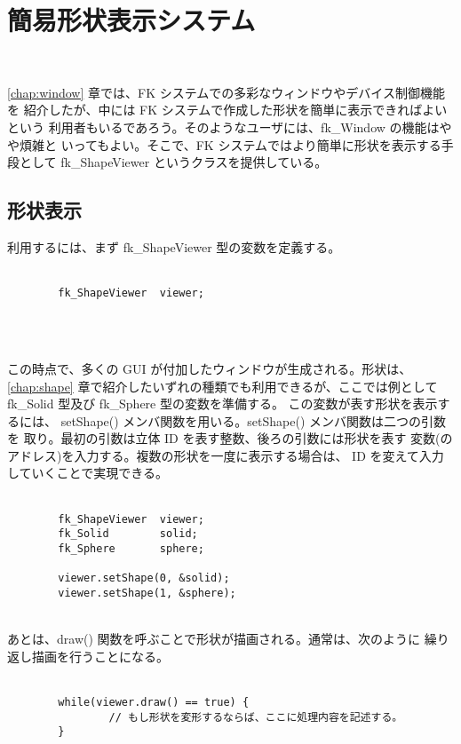 \chapter{簡易形状表示システム} \label{chap:viewer} ~

\ref{chap:window} 章では、FK システムでの多彩なウィンドウやデバイス制御機能を
紹介したが、中には FK システムで作成した形状を簡単に表示できればよいという
利用者もいるであろう。そのようなユーザには、fk\_Window の機能はやや煩雑と
いってもよい。そこで、FK システムではより簡単に形状を表示する手段として
fk\_ShapeViewer というクラスを提供している。

\section{形状表示}
利用するには、まず fk\_ShapeViewer 型の変数を定義する。\\ ~ \\
\begin{screen}
\begin{verbatim}
        fk_ShapeViewer  viewer;
\end{verbatim}
\end{screen}
\\ ~

この時点で、多くの GUI が付加したウィンドウが生成される。形状は、
\ref{chap:shape} 章で紹介したいずれの種類でも利用できるが、ここでは例として
fk\_Solid 型及び fk\_Sphere 型の変数を準備する。
この変数が表す形状を表示するには、
setShape() メンバ関数を用いる。setShape() メンバ関数は二つの引数を
取り。最初の引数は立体 ID を表す整数、後ろの引数には形状を表す
変数(のアドレス)を入力する。複数の形状を一度に表示する場合は、
ID を変えて入力していくことで実現できる。\\ ~ \\
\begin{breakbox}
\begin{verbatim}
        fk_ShapeViewer  viewer;
        fk_Solid        solid;
        fk_Sphere       sphere;

        viewer.setShape(0, &solid);
        viewer.setShape(1, &sphere);
\end{verbatim}
\end{breakbox}
~ \\

あとは、draw() 関数を呼ぶことで形状が描画される。通常は、次のように
繰り返し描画を行うことになる。\\ ~ \\
\begin{breakbox}
\begin{verbatim}
        while(viewer.draw() == true) {
                // もし形状を変形するならば、ここに処理内容を記述する。
        }
\end{verbatim}
\end{breakbox}
~ \\

